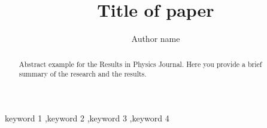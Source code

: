 \documentclass[final,5p,times,twocolumn,authoryear]{elsarticle}
\begin{document}
\begin{frontmatter}



\title{Title of paper}


\author[first]{Author name}

\begin{abstract}
Abstract example for the Results in Physics Journal. Here you provide a brief summary of the research and the results.
\end{abstract}



\begin{keyword}
keyword 1 \sep keyword 2 \sep keyword 3 \sep keyword 4



\end{keyword}


\end{frontmatter}
\end{document}
